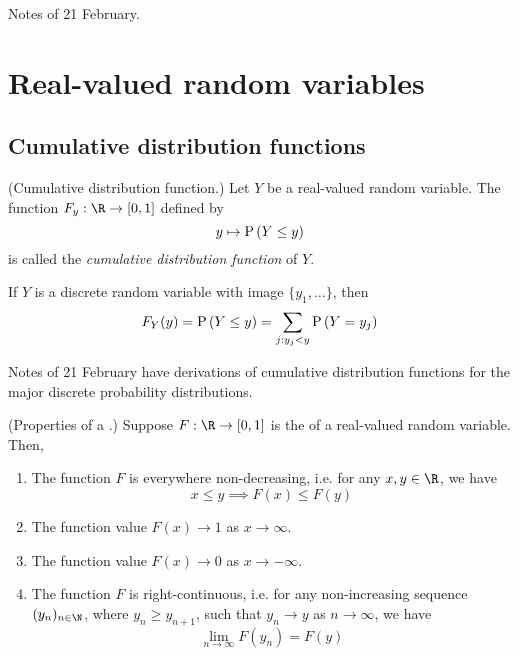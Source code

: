 \documentclass[11pt]{article}
\begin{document}
Notes of 21 February.

\section{Real-valued random variables}

\subsection{Cumulative distribution functions}

\begin{defn}{(Cumulative distribution function.)}
    \label{def:cdf}
    Let $Y$ be a real-valued random variable.
    The function $F_y : \R \to [0, 1]$ defined by
    \begin{equation}
        \label{eq:cdf}
        y \mapsto \P{Y \leq y}
    \end{equation}
    is called the \emph{cumulative distribution function} of $Y$.
\end{defn}

\begin{rem}
    If $Y$ is a discrete random variable with image $\{y_1, \ldots\}$,
    then
    \begin{equation*}
        F_Y(y)
        = \P{Y \leq y}
        = \sum_{j : y_j < y} {
            \P{Y = y_j}
        }
    \end{equation*}
\end{rem}

Notes of 21 February have derivations of cumulative distribution functions for
the major discrete probability distributions.

\begin{thm}{(Properties of a \cdf.)}
    \label{thm:cdf-properties}
    Suppose $F : \R \to \unit$ is the \cdf{} of a real-valued random variable.
    Then,
    \begin{enumerate}
        \item
            The function $F$ is everywhere non-decreasing,
            i.e. for any $x, y \in \R$, we have
            \begin{equation*}
                x \leq y \implies F(x) \leq F(y)
            \end{equation*}
        \item
            The function value $F(x) \to 1$ as $x \to \infty$.
        \item
            The function value $F(x) \to 0$ as $x \to -\infty$.
        \item
            The function $F$ is right-continuous, i.e.
            for any non-increasing sequence $(y_n)_{n\in\N}$,
            where $y_n \geq y_{n+1}$, such that $y_n \to y$ as $n \to \infty$,
            we have
            \begin{equation}
                \label{eq:cdf-is-right-continuous}
                \lim_{n\to\infty} F(y_n) = F(y)
            \end{equation}
    \end{enumerate}
\end{thm}
\end{document}
